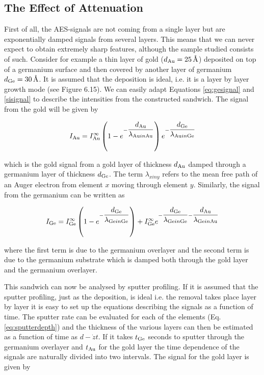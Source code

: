 \subsection{The Effect of Attenuation}
First of all, the AES-signals are not coming from a single layer but are exponentially damped signals from several layers. This means that we can never expect to obtain extremely sharp features, although the sample studied consists of such. Consider for example a thin layer of gold ($d_{\ce{Au}}=\SI{25}{\angstrom}$) deposited on top of a germanium surface and then covered by another layer of germanium $d_{\ce{Ge}}=\SI{30}{\angstrom}$. It is assumed that the deposition is ideal, i.e. it is a layer by layer growth mode (see Figure 6.15). We can easily adapt Equations \eqref{eq:gesignal} and \eqref{sisignal} to describe the intensities from the constructed sandwich. The signal from the gold will be given by

\begin{equation}
I_{\ce{Au}}=I^{\infty}_{\ce{Au}}\left(1-e^{-\dfrac{d_{\ce{Au}}}{\lambda_{\ce{Au} in \ce{Au}}}}\right)e^{-\dfrac{d_{\ce{Ge}}}{\lambda_{\ce{Au} in \ce{Ge}}}} 
\end{equation}

which is the gold signal from a gold layer of thickness $d_{\ce{Au}}$ damped through a germanium layer of thickness $d_{\ce{Ge}}$. The term $\lambda_{x in y}$ refers to the mean free path of an Auger electron from element $x$ moving through element $y$. Similarly, the signal from the germanium can be written as

\begin{equation}
I_{\ce{Ge}}=I^{\infty}_{\ce{Ge}}\left(1-e^{-\dfrac{d_{\ce{Ge}}}{\lambda_{\ce{Ge} in \ce{Ge}}}}\right)+ I^{\infty}_{\ce{Ge}}e^{-\dfrac{d_{\ce{Ge}}}{\lambda_{\ce{Ge} in \ce{Ge}}}-\dfrac{d_{\ce{Au}}}{\lambda_{\ce{Ge} in \ce{Au}}}}
\end{equation}

where the first term is due to the germanium overlayer and the second term is due to the germanium substrate which is damped both through the gold layer and the germanium overlayer.

This sandwich can now be analysed by sputter profiling. If it is assumed that the sputter profiling, just as the deposition, is ideal i.e. the removal takes place layer by layer it is easy to set up the equations describing the signals as a function of time. The sputter rate can be evaluated for each of the elements (Eq. \eqref{eq:sputterdepth}) and the thickness of the various layers can then be estimated as a function of time as $d-\dot{z}t$. If it takes $t_{\ce{Ge}}$ seconds to sputter through the germanium overlayer and $t_{\ce{Au}}$ for the gold layer the time dependence of the signals are naturally divided into two intervals. The signal for the gold layer is given by

